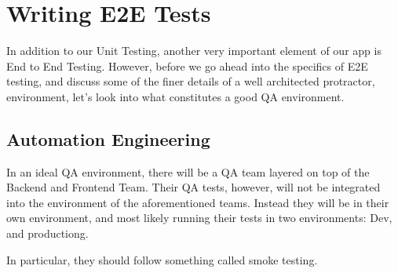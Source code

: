 \maketitle{}
\section{ Writing E2E Tests }

In addition to our Unit Testing, another very important element of our app is
End to End Testing. However, before we go ahead into the specifics of E2E
testing, and discuss some of the finer details of a well architected protractor,
environment, let's look into what constitutes a good QA environment.

\subsection{ Automation Engineering }
In an ideal QA environment, there will be a QA team layered on top of the
Backend and Frontend Team. Their QA tests, however, will not be integrated into
the environment of the aforementioned teams. Instead they will be in their own
environment, and most likely running their tests in two environments: Dev, and
productiong.

In particular, they should follow something called smoke testing.

